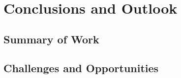 \chapter{Conclusions and Outlook}
\label{ch:outlook}


\dictum[]{%
  }%

\vspace{1em}



\section{Summary of Work}
\label{sec:outlook-summ}


\section{Challenges and Opportunities}
\label{sec:outlook-challenge}



